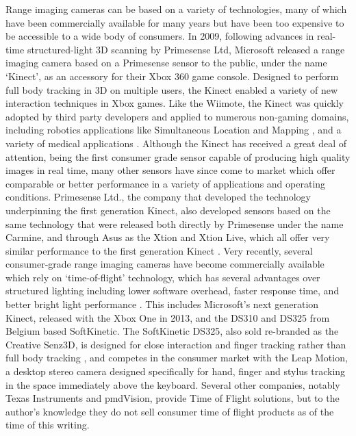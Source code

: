 Range imaging cameras can be based on a variety of technologies, many of which have been commercially available for many years but have been too expensive to be accessible to a wide body of consumers. In 2009, following advances in real-time structured-light 3D scanning by Primesense Ltd, Microsoft released a range imaging camera based on a Primesense sensor to the public, under the name `Kinect', as an accessory for their Xbox 360 game console. Designed to perform full body tracking in 3D on multiple users, the Kinect enabled a variety of new interaction techniques in Xbox games. Like the Wiimote, the Kinect was quickly adopted by third party developers and applied to numerous non-gaming domains, including robotics applications like Simultaneous Location and Mapping \cite{iser-rgbd-slam}, and a variety of medical applications \cite{kinect-medical}. Although the Kinect has received a great deal of attention, being the first consumer grade sensor capable of producing high quality images in real time, many other sensors have since come to market which offer comparable or better performance in a variety of applications and operating conditions. Primesense Ltd., the company that developed the technology underpinning the first generation Kinect, also developed sensors based on the same technology that were released both directly by Primesense under the name Carmine, and through Asus as the Xtion  and Xtion Live, which all offer very similar performance to the first generation Kinect \cite{depth-sensor-comparison}. Very recently, several consumer-grade range imaging cameras have become commercially available which rely on `time-of-flight' technology, which has several advantages over structured lighting including lower software overhead, faster response time, and better bright light performance \cite{ti-tof}. This includes Microsoft's next generation Kinect, released with the Xbox One in 2013, and the DS310 and DS325 from Belgium based SoftKinetic. The SoftKinetic DS325, also sold re-branded as the Creative Senz3D, is designed for close interaction and finger tracking rather than full body tracking \cite{softkinetc-products}, and competes in the consumer market with the Leap Motion, a desktop stereo camera designed specifically for hand, finger and stylus tracking in the space immediately above the keyboard. Several other companies, notably Texas Instruments and pmdVision, provide Time of Flight solutions, but to the author's knowledge they do not sell consumer time of flight products as of the time of this writing. 

